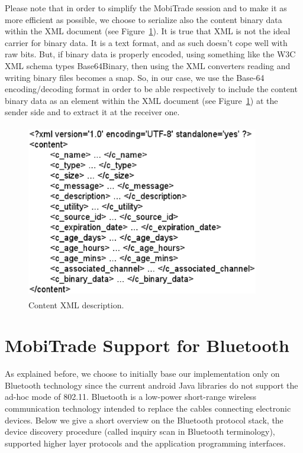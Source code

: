 Please note that in order to simplify the MobiTrade session and to make it as more efficient as possible, we choose to serialize also the content binary data within the XML document (see Figure~\ref{contentxml}). It is true that XML is not the ideal carrier for binary data. It is a text format, and as such doesn't cope well with raw bits. But, if binary data is properly encoded, using something like the W3C XML schema types Base64Binary, then using the XML converters reading and writing binary files becomes a snap. So, in our case, we use the Base-64 encoding/decoding format in order to be able respectively to include the content binary data as an element within the XML document (see Figure~\ref{contentxml}) at the sender side and to extract it at the receiver one.  

\begin{figure}[!h]
\begin{center}
\includegraphics[width=4in,height=3in]{Chapitre6/contentxml.eps}
\end{center}
\caption{Content XML description.}
\label{contentxml}
\end{figure}






\section{MobiTrade Support for Bluetooth}
\label{MobiTradeDesignAndImplementation}

As explained before, we choose to initially base our implementation only on Bluetooth technology since the current android Java libraries do not support the ad-hoc mode of 802.11. Bluetooth is a low-power short-range wireless communication technology intended to replace the cables connecting electronic devices. Below we give a short overview on the Bluetooth protocol stack, the device discovery procedure (called inquiry scan in Bluetooth terminology), supported higher layer protocols and the application programming interfaces.

